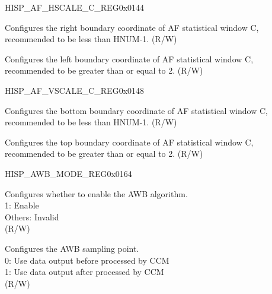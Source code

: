 \begin{register}{H}{ISP\_AF\_HSCALE\_C\_REG}{0x0144}\label{regdesc:ISPAFHSCALECREG}
%
%
%
%
\regnewline%
\begin{regdesc}\begin{reglist}
\label{fielddesc:ISPAFRPOINTC}\item [ISP\_AF\_RPOINT\_C] Configures the right boundary coordinate of AF statistical window C, recommended to be less than HNUM-1. (R/W)
\label{fielddesc:ISPAFLPOINTC}\item [ISP\_AF\_LPOINT\_C] Configures the left boundary coordinate of AF statistical window C, recommended to be greater than or equal to 2. (R/W)
\end{reglist}\end{regdesc}
\end{register}


\begin{register}{H}{ISP\_AF\_VSCALE\_C\_REG}{0x0148}\label{regdesc:ISPAFVSCALECREG}
%
%
%
%
\regnewline%
\begin{regdesc}\begin{reglist}
\label{fielddesc:ISPAFBPOINTC}\item [ISP\_AF\_BPOINT\_C] Configures the bottom boundary coordinate of AF statistical window C, recommended to be less than HNUM-1. (R/W)
\label{fielddesc:ISPAFTPOINTC}\item [ISP\_AF\_TPOINT\_C] Configures the top boundary coordinate of AF statistical window C, recommended to be greater than or equal to 2. (R/W)
\end{reglist}\end{regdesc}
\end{register}


\begin{register}{H}{ISP\_AWB\_MODE\_REG}{0x0164}\label{regdesc:ISPAWBMODEREG}
%
%
%
%
\regnewline%
\begin{regdesc}\begin{reglist}
\label{fielddesc:ISPAWBMODE}\item [ISP\_AWB\_MODE] Configures whether to enable the AWB algorithm.\\1: Enable\\Others: Invalid\\(R/W)
\label{fielddesc:ISPAWBSAMPLE}\item [ISP\_AWB\_SAMPLE] Configures the AWB sampling point.\\0: Use data output before processed by CCM\\1: Use data output after processed by CCM\\(R/W)
\end{reglist}\end{regdesc}
\end{register}



